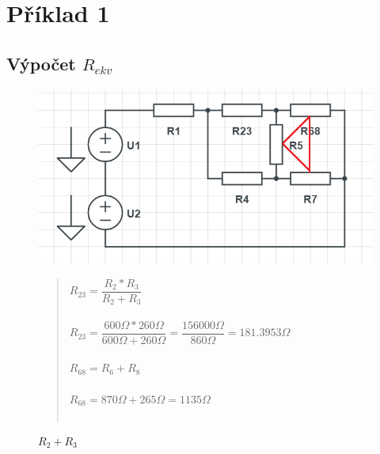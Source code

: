 \section{Příklad 1}
\subsection{Výpočet $R_{ekv}$}
\begin{figure}[H]
     \centering
     \includegraphics[scale=0.6]{pic1/u1o1.png}
     \caption{$R_2 + R_3$}
     \label{fig:Paralel_resistor_R23}
     \begin{quote}
     \centering
     $R_{23} =  \dfrac{R_2 * R_3}{R_2 + R_3} $  \\~\\
     $R_{23} =  \dfrac{600\Omega * 260\Omega}{600\Omega + 260\Omega} = 
     \dfrac{156000\Omega}{860\Omega} = 181.3953\Omega$ \\~\\
     $R_{68} =  {R_6 + R_8} $  \\~\\
     $R_{68} =  {870\Omega + 265\Omega} = {1135\Omega} $\\~\\
\end{quote}
\end{figure}
